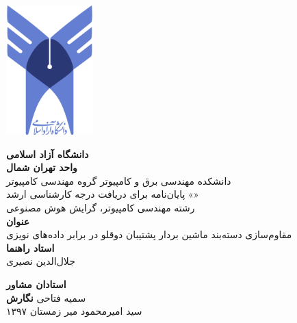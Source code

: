 \thispagestyle{empty}

\centerline{\includegraphics[height=5cm]{logo.png}}

\begin{center}
\vspace{0.5cm}

\textbf{دانشگاه آزاد اسلامی}
\\[.2cm]
\textbf{واحد تهران شمال}
\\[0.5cm]

دانشکده مهندسی برق و کامپیوتر گروه مهندسی کامپیوتر
\\[.5cm]
پایان‌نامه برای دریافت درجه کارشناسی ارشد «»
\\[.2cm]
رشته مهندسی کامپیوتر، گرایش هوش مصنوعی
\\[0.5cm]

{\Large
\textbf{عنوان}
}
\\
مقاوم‌سازی دسته‌بند ماشین بردار پشتیبان دوقلو در برابر داده‌های نویزی
\\[0.5cm]

{\Large
	\textbf{استاد راهنما}
}
\\
جلال‌ا‌لدین نصیری
\vskip 0.5cm

{\Large
	\textbf{استادان مشاور}
}
\\
سمیه فتاحی
\vskip 0.5cm
{\Large
	\textbf{نگارش}
}
\\
سید امیرمحمود میر
\vskip 0.5cm
زمستان ۱۳۹۷
\end{center}